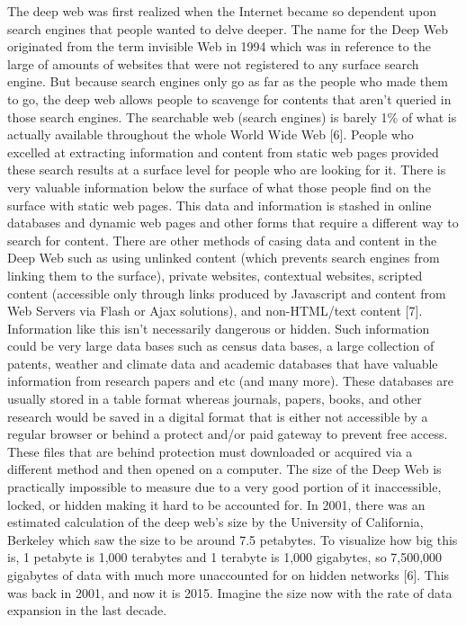 \documentclass[twocolumn,letterpaper,10pt]{article}
\begin{document}
The deep web was first realized when the Internet became so dependent upon search engines that people wanted to delve deeper. The name for the Deep Web originated from the term invisible Web in 1994 which was in reference to the large of amounts of websites that were not registered to any surface search engine. But because search engines only go as far as the people who made them to go, the deep web allows people to scavenge for contents that aren't queried in those search engines. The searchable web (search engines) is barely 1\% of what is actually available throughout the whole World Wide Web [6]. People who excelled at extracting information and content from static web pages provided these search results at a surface level for people who are looking for it. There is very valuable information below the surface of what those people find on the surface with static web pages. This data and information is stashed in online databases and dynamic web pages and other forms that require a different way to search for content. There are other methods of casing data and content in the Deep Web such as using unlinked content (which prevents search engines from linking them to the surface), private websites, contextual websites, scripted content (accessible only through links produced by Javascript and content from Web Servers via Flash or Ajax solutions), and non-HTML/text content [7]. Information like this isn't necessarily dangerous or hidden. Such information could be very large data bases such as census data bases, a large collection of patents, weather and climate data and academic databases that have valuable information from research papers and etc (and many more). These databases are usually stored in a table format whereas journals, papers, books, and other research would be saved in a digital format that is either not accessible by a regular browser or behind a protect and/or paid gateway to prevent free access. These files that are behind protection must downloaded or acquired via a different method and then opened on a computer. The size of the Deep Web is practically impossible to measure due to a very good portion of it inaccessible, locked, or hidden making it hard to be accounted for. In 2001, there was an estimated calculation of the deep web's size by the University of California, Berkeley which saw the size to be around 7.5 petabytes. To visualize how big this is, 1 petabyte is 1,000 terabytes and 1 terabyte is 1,000 gigabytes, so 7,500,000 gigabytes of data with much more unaccounted for on hidden networks [6]. This was back in 2001, and now it is 2015. Imagine the size now with the rate of data expansion in the last decade.
\end{document}
